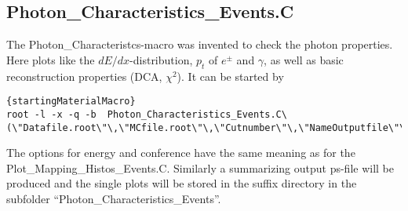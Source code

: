 		\subsection{Photon\_Characteristics\_Events.C}
		The Photon\_Characteristcs-macro was invented to check the photon properties. Here plots like the $dE/dx$-distribution, $p_t$ of $e^\pm$ and $\gamma$, as well as basic reconstruction properties (DCA, $\chi^2$). It can be started by
		\begin{lstlisting}[]{startingMaterialMacro}
root -l -x -q -b  Photon_Characteristics_Events.C\(\"Datafile.root\"\,\"MCfile.root\"\,\"Cutnumber\"\,\"NameOutputfile\"\,\"Suffix\"\,\"optConf\"\,\"optEn\"\)
		\end{lstlisting}
		 The options for energy and conference have the same meaning as for the Plot\_Mapping\_Histos\_Events.C. Similarly a summarizing output ps-file will be produced and the single plots will be stored in the suffix directory in the subfolder ``Photon\_Characteristics\_Events''. 
	
